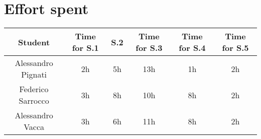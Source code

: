 \section{Effort spent}
\begin{tabular}{ | c || c | c | c | c | c|}
    \hline
    Student             & Time for S.1 & S.2 & Time for S.3 & Time for S.4 & Time for S.5 \\ \hline
    Alessandro Pignati  & 2h           & 5h  & 13h          & 1h           & 2h           \\ \hline
    Federico Sarrocco   & 3h           & 8h  & 10h          & 8h           & 2h           \\ \hline
    Alessandro Vacca    & 3h           & 6h  & 11h          & 8h           &2h            \\
    \hline
\end{tabular}